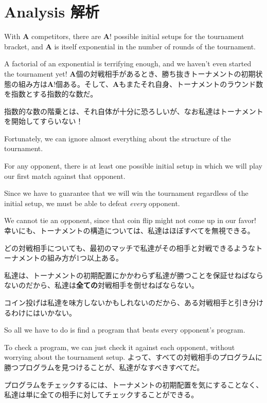 \documentclass[uplatex,dvipdfmx]{jsarticle} \usepackage{amsmath,amssymb,bm}
\begin{document}
\section*{Analysis 解析}
\begin{paracol}{2}
With $\mathbf{A}$ competitors, there are $\mathbf{A}!$ possible initial setups for the tournament bracket, and $\mathbf{A}$ is itself exponential in the number of rounds of the tournament.

A factorial of an exponential is terrifying enough, and we haven't even started the tournament yet!
\switchcolumn
$\mathbf{A}$個の対戦相手があるとき、勝ち抜きトーナメントの初期状態の組み方は$\mathbf{A}!$個ある。そして、$\mathbf{A}$もまたそれ自身、トーナメントのラウンド数を指数とする指数的な数だ。

指数的な数の階乗とは、それ自体が十分に恐ろしいが、なお私達はトーナメントを開始してすらいない！
\end{paracol}
\vspace{\baselineskip}
\begin{paracol}{2}
Fortunately, we can ignore almost everything about the structure of the tournament.

For any opponent, there is at least one possible initial setup in which we will play our first match against that opponent.

Since we have to guarantee that we will win the tournament regardless of the initial setup, we must be able to defeat {\it every} opponent.

We cannot tie an opponent, since that coin flip might not come up in our favor!
\switchcolumn
幸いにも、トーナメントの構造については、私達はほぼすべてを無視できる。

どの対戦相手についても、最初のマッチで私達がその相手と対戦できるようなトーナメントの組み方が1つ以上ある。

私達は、トーナメントの初期配置にかかわらず私達が勝つことを保証せねばならないのだから、私達は{\bf 全ての}対戦相手を倒せねばならない。

コイン投げは私達を味方しないかもしれないのだから、ある対戦相手と引き分けるわけにはいかない。
\end{paracol}
\vspace{\baselineskip}
\begin{paracol}{2}
So all we have to do is find a program that beats every opponent's program.

To check a program, we can just check it against each opponent, without worrying about the tournament setup.
\switchcolumn
よって、すべての対戦相手のプログラムに勝つプログラムを見つけることが、私達がなすべきすべてだ。

プログラムをチェックするには、トーナメントの初期配置を気にすることなく、私達は単に全ての相手に対してチェックすることができる。
\end{paracol}
\end{document}
